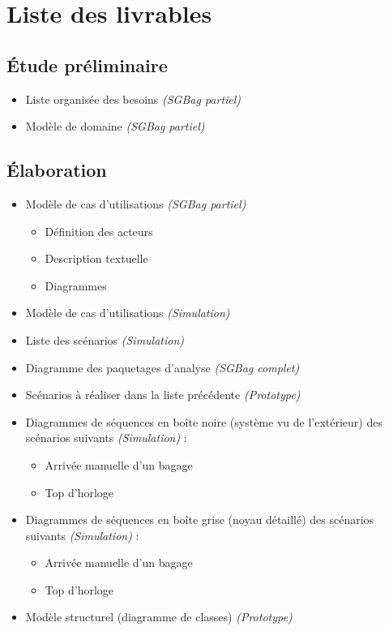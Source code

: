 \newcommand{\SGBag}{\emph{(SGBag complet)}}
\newcommand{\SGBagP}{\emph{(SGBag partiel)}}
\newcommand{\Simu}{\emph{(Simulation)}}
\newcommand{\Proto}{\emph{(Prototype)}}
\let\phase\subsection

\section{Liste des livrables}
\phase{Étude préliminaire}
\begin{itemize}
	\item Liste organisée des besoins \SGBagP
	\item Modèle de domaine \SGBagP
\end{itemize}

\phase{Élaboration}
\begin{itemize}
	\item Modèle de cas d'utilisations \SGBagP
	\begin{itemize}
		\item Définition des acteurs
		\item Description textuelle
		\item Diagrammes
	\end{itemize}
	\item Modèle de cas d'utilisations \Simu
	\item Liste des scénarios \Simu
	\item Diagramme des paquetages d'analyse \SGBag
	\item Scénarios à réaliser dans la liste précédente \Proto
	\item Diagrammes de séquences en boîte noire (système vu de l'extérieur) des scénarios suivants \Simu{} :
	\begin{itemize}
		\item Arrivée manuelle d'un bagage
		\item Top d'horloge
	\end{itemize}
	\item Diagrammes de séquences en boîte grise (noyau détaillé) des scénarios suivants \Simu{} :
	\begin{itemize}
		\item Arrivée manuelle d'un bagage
		\item Top d'horloge
	\end{itemize}
	\item Modèle structurel (diagramme de classes) \Proto
\end{itemize}

